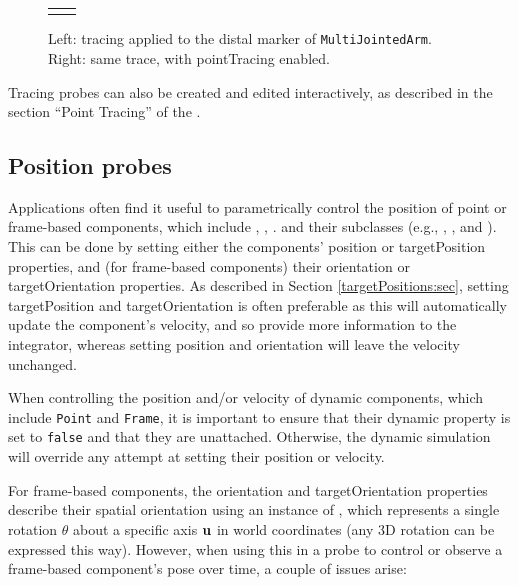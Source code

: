 \begin{figure}[h]
\begin{center}
\begin{tabular}{cc}
\fi
\end{tabular}
\end{center}
\caption{Left: tracing applied to the distal marker of
{\tt MultiJointedArm}. Right: same trace, with
{\sf pointTracing} enabled.}
\label{PointLineTracing:fig}
\end{figure}

\begin{sideblock}
Tracing probes can also be created and edited interactively,
as described in the section ``Point Tracing'' of the
.
\end{sideblock}

\subsection{Position probes}
\label{PositionProbes:sec}

Applications often find it useful to parametrically control the position of
point or frame-based components, which include
,
,
.
and their subclasses
(e.g., ,
,
and
).
This can be done by setting either the components' {\sf position} or {\sf
targetPosition} properties, and (for frame-based components) their {\sf
orientation} or {\sf targetOrientation} properties. As described
in Section \ref{targetPositions:sec}, setting {\sf
targetPosition} and {\sf targetOrientation} is often preferable as this will
automatically update the component's velocity, and so provide more information
to the integrator, whereas setting {\sf position} and {\sf orientation} will
leave the velocity unchanged.

\begin{sideblock}
When controlling the position and/or velocity of dynamic components, which
include {\tt Point} and {\tt Frame}, it is important to ensure that their {\sf
dynamic} property is set to {\tt false} and that they are
unattached. Otherwise, the dynamic simulation will override any attempt at
setting their position or velocity.
\end{sideblock}

For frame-based components, the {\sf orientation} and {\sf targetOrientation}
properties describe their spatial orientation using an instance of
, which represents
a single rotation $\theta$ about a specific axis ${\bf u}$ in world coordinates (any
3D rotation can be expressed this way). However, when using this in a probe to
control or observe a frame-based component's pose over time, a couple
of issues arise:

